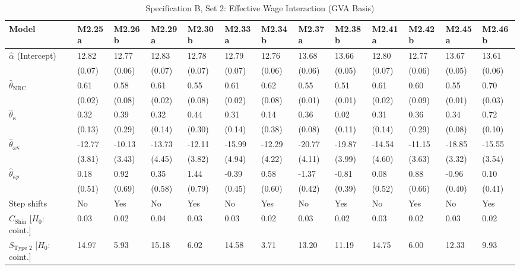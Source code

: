 \FloatBarrier
\begin{table}[h!]
	\centering
	\caption{Specification B, Set 2: Effective Wage Interaction (GVA Basis)}
	\label{tab:specB_set2_gva_app}
	\tiny
	\setlength{\tabcolsep}{1.5pt}
	\begin{tabular}{p{3.2cm}p{1.0cm}p{1.0cm}p{1.0cm}p{1.0cm}p{1.0cm}p{1.0cm}p{1.0cm}p{1.0cm}p{1.0cm}p{1.0cm}p{1.0cm}p{1.0cm}}
		\toprule
		Model & M2.25a & M2.26b & M2.29a & M2.30b & M2.33a & M2.34b & M2.37a & M2.38b & M2.41a & M2.42b & M2.45a & M2.46b \\
		\midrule
		$\hat{\alpha}$ (Intercept) & 12.82 & 12.77 & 12.83 & 12.78 & 12.79 & 12.76 & 13.68 & 13.66 & 12.80 & 12.77 & 13.67 & 13.61 \\
		& (0.07) & (0.06) & (0.07) & (0.07) & (0.07) & (0.06) & (0.06) & (0.05) & (0.07) & (0.06) & (0.05) & (0.06) \\
		$\hat{\theta}_{\text{NRC}}$ & 0.61 & 0.58 & 0.61 & 0.55 & 0.61 & 0.62 & 0.55 & 0.51 & 0.61 & 0.60 & 0.55 & 0.70 \\
		& (0.02) & (0.08) & (0.02) & (0.08) & (0.02) & (0.08) & (0.01) & (0.01) & (0.02) & (0.09) & (0.01) & (0.03) \\
		$\hat{\theta}_{\kappa}$ & 0.32 & 0.39 & 0.32 & 0.44 & 0.31 & 0.14 & 0.36 & 0.02 & 0.31 & 0.36 & 0.34 & 0.72 \\
		& (0.13) & (0.29) & (0.14) & (0.30) & (0.14) & (0.38) & (0.08) & (0.11) & (0.14) & (0.29) & (0.08) & (0.10) \\
		$\hat{\theta}_{\omega\kappa}$ & -12.77 & -10.13 & -13.73 & -12.11 & -15.99 & -12.29 & -20.77 & -19.87 & -14.54 & -11.15 & -18.85 & -15.55 \\
		& (3.81) & (3.43) & (4.45) & (3.82) & (4.94) & (4.22) & (4.11) & (3.99) & (4.60) & (3.63) & (3.32) & (3.54) \\
		$\hat{\theta}_{\kappa p}$ & 0.18 & 0.92 & 0.35 & 1.44 & -0.39 & 0.58 & -1.37 & -0.81 & 0.08 & 0.88 & -0.96 & 0.10 \\
		& (0.51) & (0.69) & (0.58) & (0.79) & (0.45) & (0.60) & (0.42) & (0.39) & (0.52) & (0.66) & (0.40) & (0.41) \\
		\midrule
		Step shifts & No & Yes & No & Yes & No & Yes & No & Yes & No & Yes & No & Yes \\
		$C_{\text{Shin}}$ [$H_0$: coint.] & 0.03 & 0.02 & 0.04 & 0.03 & 0.03 & 0.02 & 0.03 & 0.02 & 0.03 & 0.02 & 0.03 & 0.02 \\
		$S_{\text{Type 2}}$ [$H_0$: coint.] & 14.97 & 5.93 & 15.18 & 6.02 & 14.58 & 3.71 & 13.20 & 11.19 & 14.75 & 6.00 & 12.33 & 9.93 \\

\end{tabular}
\end{table}
